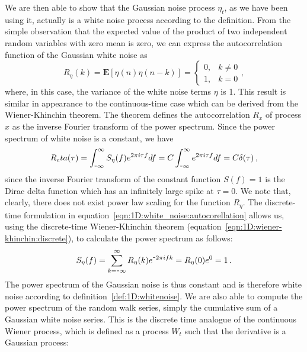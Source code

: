 {{We are then able to show that the Gaussian noise process $\eta_t$, as we have been using it, actually is a white noise process according to the definition. From the simple observation that the expected value of the product of two independent random variables with zero mean is zero, we can express the autocorrelation function of the Gaussian white noise as
\begin{equation}
	\label{eqn:1D:white_noise:autocorellation}
	R_\eta(k) = \mathbf{E}\left[\eta(n) \eta(n-k)\right] 
	= \left\{ \begin{array}{lr}
	0 , & k\neq 0 \\
	1 , & k=0
	\end{array} \right. ,
\end{equation}
where, in this case, the variance of the white noise terms $\eta$ is 1. This result is similar in appearance to the continuous-time case which can be derived from the Wiener-Khinchin theorem. The theorem defines the autocorrelation $R_x$ of process $x$ as the inverse Fourier transform of the power spectrum. Since the power spectrum of white noise is a constant, we have
\begin{equation}
	\label{eqn:1D:autocorrrelation_dirac}
	R_eta(\tau) = \int_{\textup{\texttt{-}} \infty}^\infty S_\eta(f)e^{2\pi i \tau f}df = C\int_{\textup{\texttt{-}} \infty}^\infty e^{2\pi i \tau f}df = C\delta(\tau)\,,
\end{equation} 
since the inverse Fourier transform of the constant function $S(f)=1$ is the Dirac delta function \citep{kammler2007fourier} which has an infinitely large spike at $\tau =0$. We note that, clearly, there does not exist power law scaling for the function $R_\eta$. The discrete-time formulation in equation~\ref{eqn:1D:white_noise:autocorellation} allows us, using the discrete-time Wiener-Khinchin theorem (equation~\ref{eqn:1D:wiener-khinchin:discrete}), to calculate the power spectrum as follows:
\begin{equation}
\label{eqn:1D:PSofWhiteNoise}
	S_\eta(f) = \sum_{k=\textup{\texttt{-}} \infty}^{\infty} R_\eta(k) e^{\textup{\texttt{-}} 2\pi i f k} = R_\eta(0) e^{0} = 1\,.
\end{equation}
The power spectrum of the Gaussian noise is thus constant and is therefore white noise according to definition~\ref{def:1D:whitenoise}. We are also able to compute the power spectrum of the random walk series, simply the cumulative sum of a Gaussian white noise series. This is the discrete time analogue of the continuous Wiener process, which is defined as a process $W_t$ such that the derivative is a Gaussian process:
\begin{equation}

\end{equation}}}
